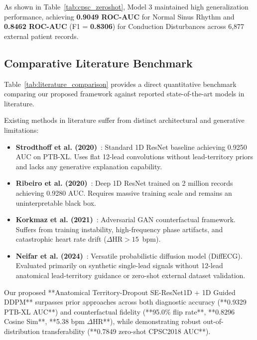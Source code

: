 \documentclass[5p,twocolumn,10pt]{elsarticle}
\begin{document}
As shown in Table~\ref{tab:cpsc_zeroshot}, Model 3 maintained high generalization performance, achieving \textbf{0.9049 ROC-AUC} for Normal Sinus Rhythm and \textbf{0.8462 ROC-AUC} (F1 = \textbf{0.8306}) for Conduction Disturbances across 6,877 external patient records.

\subsection{Comparative Literature Benchmark}
Table~\ref{tab:literature_comparison} provides a direct quantitative benchmark comparing our proposed framework against reported state-of-the-art models in literature.

Existing methods in literature suffer from distinct architectural and generative limitations:
\begin{itemize}
    \item \textbf{Strodthoff et al. (2020)}~\cite{strodthoff2020deep}: Standard 1D ResNet baseline achieving 0.9250 AUC on PTB-XL. Uses flat 12-lead convolutions without lead-territory priors and lacks any generative explanation capability.
    \item \textbf{Ribeiro et al. (2020)}~\cite{ribeiro2020automatic}: Deep 1D ResNet trained on 2 million records achieving 0.9280 AUC. Requires massive training scale and remains an uninterpretable black box.
    \item \textbf{Korkmaz et al. (2021)}~\cite{korkmaz2021deep}: Adversarial GAN counterfactual framework. Suffers from training instability, high-frequency phase artifacts, and catastrophic heart rate drift ($\Delta\text{HR} > 15$~bpm).
    \item \textbf{Neifar et al. (2024)}~\cite{neifar2024diffecg}: Versatile probabilistic diffusion model (DiffECG). Evaluated primarily on synthetic single-lead signals without 12-lead anatomical lead-territory guidance or zero-shot external dataset validation.
\end{itemize}

Our proposed **Anatomical Territory-Dropout SE-ResNet1D + 1D Guided DDPM** surpasses prior approaches across both diagnostic accuracy (**0.9329 PTB-XL AUC**) and counterfactual fidelity (**95.0\% flip rate**, **0.8296 Cosine Sim**, **5.38 bpm $\Delta\text{HR}$**), while demonstrating robust out-of-distribution transferability (**0.7849 zero-shot CPSC2018 AUC**).
\end{document}
